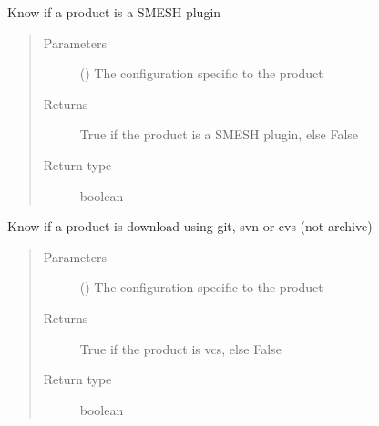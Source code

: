 \documentclass[a4paper,10pt,english]{sphinxmanual}
\begin{document}

\begin{fulllineitems}
\label{\detokenize{commands/apidoc/src:src.product.product_is_smesh_plugin}}
Know if a product is a SMESH plugin
\begin{quote}\begin{description}
\item[{Parameters}] \leavevmode
{} () \textendash{} The configuration specific to 
the product

\item[{Returns}] \leavevmode
True if the product is a SMESH plugin, else False

\item[{Return type}] \leavevmode
boolean

\end{description}\end{quote}

\end{fulllineitems}


\begin{fulllineitems}
\label{\detokenize{commands/apidoc/src:src.product.product_is_vcs}}
Know if a product is download using git, svn or cvs (not archive)
\begin{quote}\begin{description}
\item[{Parameters}] \leavevmode
{} () \textendash{} The configuration specific to 
the product

\item[{Returns}] \leavevmode
True if the product is vcs, else False

\item[{Return type}] \leavevmode
boolean

\end{description}\end{quote}

\end{fulllineitems}
\end{document}
